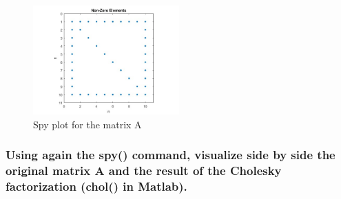 \documentclass[unicode,11pt,a4paper,oneside,numbers=endperiod,openany]{scrartcl}
\begin{document}
\begin{figure}[H]
    \centering
    \includegraphics[width=0.5\textwidth]{images/nbyn.jpg}
    \caption{Spy plot for the matrix A}
    \label{fig:spy-plot}
\end{figure}

\subsubsection{Using again the spy() command, visualize side by side the original matrix A and the result of the Cholesky factorization (chol() in Matlab).}
\end{document}
